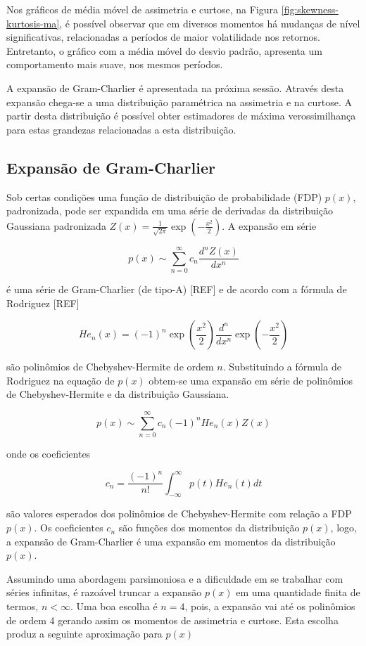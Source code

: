 \documentclass[]{article}
\begin{document}
Nos gráficos de média móvel de assimetria e curtose, na Figura
\ref{fig:skewness-kurtosis-ma}, é possível observar que em diversos
momentos há mudanças de nível significativas, relacionadas a períodos de
maior volatilidade nos retornos. Entretanto, o gráfico com a média móvel
do desvio padrão, apresenta um comportamento mais suave, nos mesmos
períodos.

A expansão de Gram-Charlier é apresentada na próxima sessão. Através
desta expansão chega-se a uma distribuição paramétrica na assimetria e
na curtose. A partir desta distribuição é possível obter estimadores de
máxima verossimilhança para estas grandezas relacionadas a esta
distribuição.

\subsection{Expansão de Gram-Charlier}\label{expansao-de-gram-charlier}

Sob certas condições uma função de distribuição de probabilidade (FDP)
\(p(x)\), padronizada, pode ser expandida em uma série de derivadas da
distribuição Gaussiana padronizada
\(Z(x) = \frac{1}{\sqrt{2\pi}}\exp\left(-\frac{x^2}{2}\right)\). A
expansão em série

\[
p(x) \sim \sum_{n=0}^\infty c_n \frac{d^n Z(x)}{dx^n}
\]

é uma série de Gram-Charlier (de tipo-A) {[}REF{]} e de acordo com a
fórmula de Rodriguez {[}REF{]}

\[
He_n(x) = (-1)^n \exp\left( \frac{x^2}{2} \right) \frac{d^n}{dx^n} \exp\left( -\frac{x^2}{2} \right)
\]

são polinômios de Chebyshev-Hermite de ordem \(n\). Substituindo a
fórmula de Rodriguez na equação de \(p(x)\) obtem-se uma expansão em
série de polinômios de Chebyshev-Hermite e da distribuição Gaussiana.

\[
p(x) \sim \sum_{n=0}^\infty c_n (-1)^n He_n(x) Z(x)
\]

onde os coeficientes

\[
c_n = \frac{(-1)^n}{n!} \int_{-\infty}^{\infty} p(t) He_n(t) dt
\]

são valores esperados dos polinômios de Chebyshev-Hermite com relação a
FDP \(p(x)\). Os coeficientes \(c_n\) são funções dos momentos da
distribuição \(p(x)\), logo, a expansão de Gram-Charlier é uma expansão
em momentos da distribuição \(p(x)\).

Assumindo uma abordagem parsimoniosa e a dificuldade em se trabalhar com
séries infinitas, é razoável truncar a expansão \(p(x)\) em uma
quantidade finita de termos, \(n < \infty\). Uma boa escolha é \(n=4\),
pois, a expansão vai até os polinômios de ordem 4 gerando assim os
momentos de assimetria e curtose. Esta escolha produz a seguinte
aproximação para \(p(x)\)
\end{document}

